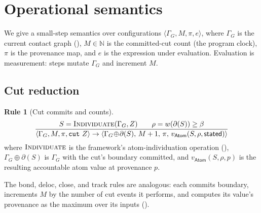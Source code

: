 \documentclass[11pt,twocolumn,a4paper]{article}
\theoremstyle{thmstyle}
\theoremstyle{definition}
\newtheorem{rulename}[theorem]{Rule}
\theoremstyle{remark}
\newcommand{\N}{\mathbb{N}}
\newcommand{\flo}{\beta}
\newcommand{\res}{\rho}
\newcommand{\cut}{\partial}
\newcommand{\hj}[1]{\texttt{#1}}
\newcommand{\stated}{\textsf{stated}}
\newcommand{\Prov}{\pi}
\begin{document}
\section{Operational semantics}
\label{sec:opsem}

We give a small-step semantics over configurations
$\langle \Gamma_G, M, \Prov, e\rangle$, where $\Gamma_G$ is the current
contact graph (), $M\in\N$ is the committed-cut
count (the program clock), $\Prov$ is the provenance map, and $e$ is the
expression under evaluation. Evaluation is measurement: steps mutate
$\Gamma_G$ and increment $M$.

\subsection{Cut reduction}

\begin{rulename}[Cut commits and counts]
\label{rule:cut-step}
\[
\frac{S=\textsc{Individuate}(\Gamma_G,Z)\qquad
      \res=w(\cut(S))\ge\flo}
     {\langle\Gamma_G,M,\Prov,\hj{cut}\ Z\rangle \to
      \langle\Gamma_G\!\oplus\!\cut(S),\,M+1,\,\Prov,\,
      v_{\mathsf{Atom}}(S,\res,\stated)\rangle}
\]
where $\textsc{Individuate}$ is the framework's atom-individuation
operation (), $\Gamma_G\!\oplus\!\cut(S)$ is
$\Gamma_G$ with the cut's boundary committed, and
$v_{\mathsf{Atom}}(S,\res,p)$ is the resulting accountable atom value at
provenance $p$.
\end{rulename}

The bond, deloc, close, and track rules are analogous: each commits
boundary, increments $M$ by the number of cut events it performs, and
computes its value's provenance as the maximum over its inputs
().
\end{document}
